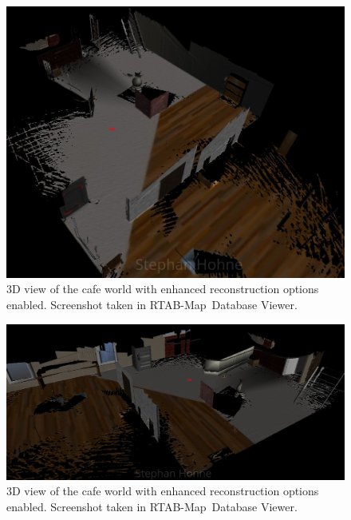 \documentclass[10pt, journal, compsoc]{IEEEtran}
\newcommand{\rtab}{RTAB-Map}
\begin{document}
\begin{figure}[thpb]
      \centering
      \includegraphics[width=\textwidth]{images/cafe_3D_left.jpg}
      \caption{3D view of the cafe world with enhanced reconstruction options enabled. Screenshot taken in \rtab\ Database Viewer.}
      \label{fig:cafe_3D_left}
\end{figure}

\begin{figure}[thpb]
      \centering
      \includegraphics[width=\textwidth]{images/cafe_3D_right.jpg}
      \caption{3D view of the cafe world with enhanced reconstruction options enabled. Screenshot taken in \rtab\ Database Viewer.}
      \label{fig:cafe_3D_right}
\end{figure}
\end{document}
